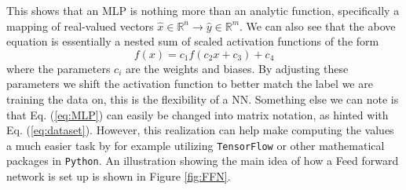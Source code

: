 \documentclass[12pt, a4paper]{book}
\begin{document}
This shows that an MLP is nothing more than an analytic function, specifically a mapping of real-valued vectors $\hat{x}\in\mathbb{R}^n\rightarrow\hat{y}\in\mathbb{R}^m$. We can also see that the above equation is essentially 
a nested sum of scaled activation functions of the form
$$
  f(x)=c_1f(c_2x+c_3)+c_4  
$$
where the parameters $c_i$ are the weights and biases. By adjusting these parameters we shift the activation function to better match the label we are training the data on, this is the flexibility of a NN. 
Something else we can note is that Eq. (\ref{eq:MLP}) can easily be changed into matrix notation, as hinted with Eq. (\ref{eq:dataset}). However, this realization can help make computing the values a much easier 
task by for example utilizing \verb|TensorFlow| \cite{TensorFlow} or other mathematical packages in \verb|Python|. An illustration showing the main idea of how a Feed forward network is set up is shown in Figure \ref{fig:FFN}.
\end{document}
